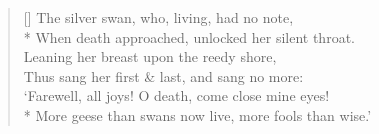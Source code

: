\documentclass[MAIN]{subfiles}
\begin{document}
\settowidth{\versewidth}{The silver swan, who, living, had no note,}
\begin{verse}[\versewidth]
The silver swan, who, living, had no note,\\*
When death approached, unlocked her silent throat.\\
Leaning her breast upon the reedy shore,\\
Thus sang her first \& last, and sang no more:\\
`Farewell, all joys! O death, come close mine eyes!\\*
More geese than swans now live, more fools than wise.'
\end{verse}
\end{document}

